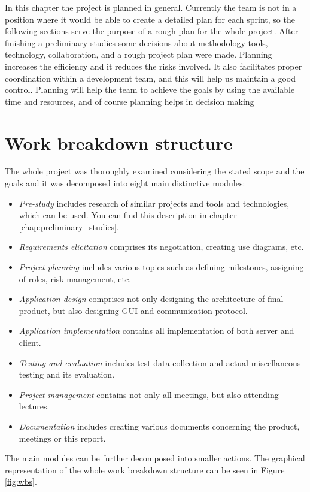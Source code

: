 In this chapter the project is planned in general. Currently the team is not in a position where it would be able to create a detailed plan for each sprint, so the following sections serve the purpose of a rough plan for the whole project. After finishing a preliminary studies some decisions about methodology tools, technology, collaboration, and a rough project plan were made. Planning increases the efficiency and it reduces the risks involved. It also facilitates proper coordination within a development team, and this will help us maintain a good control. Planning will help the team to achieve the goals by using the available time and resources, and of course planning helps in decision making  

\section{Work breakdown structure}
\label{sec:wbs}
The whole project was thoroughly examined considering the stated scope and the goals and it was decomposed into eight main distinctive modules:

\begin{itemize}
\item \emph{Pre-study} includes research of similar projects and tools and technologies, which can be used.
You can find this description in chapter \ref{chap:preliminary_studies}.
\item \emph{Requirements elicitation} comprises its negotiation, creating use diagrams, etc.
\item \emph{Project planning} includes various topics such as defining milestones, assigning of roles, risk management, etc.
\item \emph{Application design} comprises not only designing the architecture of final product, but also designing GUI and communication protocol.
\item \emph{Application implementation} contains all implementation of both server and client.
\item \emph{Testing and evaluation} includes test data collection and actual miscellaneous testing and its evaluation.
\item \emph{Project management} contains not only all meetings, but also attending lectures.
\item \emph{Documentation} includes creating various documents concerning the product, meetings or this report.
\end{itemize}

The main modules can be further decomposed into smaller actions. The graphical representation of the whole work breakdown structure can be seen in Figure \ref{fig:wbs}.

